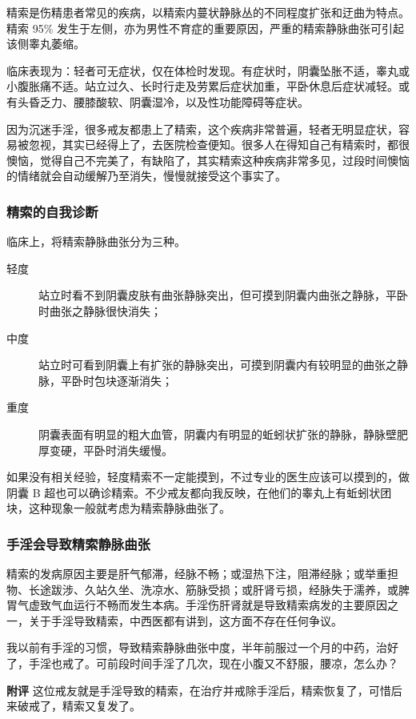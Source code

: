 精索是伤精患者常见的疾病，以精索内蔓状静脉丛的不同程度扩张和迂曲为特点。精索 95\% 发生于左侧，亦为男性不育症的重要原因，严重的精索静脉曲张可引起该侧睾丸萎缩。

临床表现为：轻者可无症状，仅在体检时发现。有症状时，阴囊坠胀不适，睾丸或小腹胀痛不适。站立过久、长时行走及劳累后症状加重，平卧休息后症状减轻。或有头昏乏力、腰膝酸软、阴囊湿冷，以及性功能障碍等症状。

因为沉迷手淫，很多戒友都患上了精索，这个疾病非常普遍，轻者无明显症状，容易被忽视，其实已经得上了，去医院检查便知。很多人在得知自己有精索时，都很懊恼，觉得自己不完美了，有缺陷了，其实精索这种疾病非常多见，过段时间懊恼的情绪就会自动缓解乃至消失，慢慢就接受这个事实了。

\subsubsection{精索的自我诊断}

临床上，将精索静脉曲张分为三种。

\begin{description}
    \item[轻度] 站立时看不到阴囊皮肤有曲张静脉突出，但可摸到阴囊内曲张之静脉，平卧时曲张之静脉很快消失；
    \item[中度] 站立时可看到阴囊上有扩张的静脉突出，可摸到阴囊内有较明显的曲张之静脉，平卧时包块逐渐消失；
    \item[重度] 阴囊表面有明显的粗大血管，阴囊内有明显的蚯蚓状扩张的静脉，静脉壁肥厚变硬，平卧时消失缓慢。
\end{description}

如果没有相关经验，轻度精索不一定能摸到，不过专业的医生应该可以摸到的，做阴囊 B 超也可以确诊精索。不少戒友都向我反映，在他们的睾丸上有蚯蚓状团块，这种现象一般就考虑为精索静脉曲张了。

\subsubsection{手淫会导致精索静脉曲张}

精索的发病原因主要是肝气郁滞，经脉不畅；或湿热下注，阻滞经脉；或举重担物、长途跋涉、久站久坐、洗凉水、筋脉受损；或肝肾亏损，经脉失于濡养，或脾胃气虚致气血运行不畅而发生本病。手淫伤肝肾就是导致精索病发的主要原因之一，关于手淫导致精索，中西医都有讲到，这方面不存在任何争议。

\begin{case}[精索静脉曲张]
    我以前有手淫的习惯，导致精索静脉曲张中度，半年前服过一个月的中药，治好了，手淫也戒了。可前段时间手淫了几次，现在小腹又不舒服，腰凉，怎么办？

    \textbf{附评} 这位戒友就是手淫导致的精索，在治疗并戒除手淫后，精索恢复了，可惜后来破戒了，精索又复发了。
\end{case}

